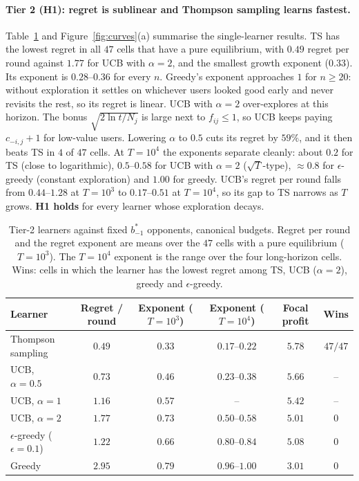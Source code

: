 \documentclass[11pt]{article}
\theoremstyle{remark}
\begin{document}
\paragraph{Tier 2 (H1): regret is sublinear and Thompson sampling learns fastest.}
Table~\ref{tab:t2} and Figure~\ref{fig:curves}(a) summarise the single-learner results. TS has the
lowest regret in all $47$ cells that have a pure equilibrium, with $0.49$ regret per round against
$1.77$ for UCB with $\alpha=2$, and the smallest growth exponent ($0.33$). Its exponent is $0.28$--$0.36$
for every $n$. Greedy's exponent approaches $1$ for $n\ge20$: without exploration it settles on whichever
users looked good early and never revisits the rest, so its regret is linear. UCB with $\alpha=2$
over-explores at this horizon. The bonus $\sqrt{2\ln t/N_j}$ is large next to $f_{ij}\le1$, so UCB keeps
paying $c_{-i,j}+1$ for low-value users. Lowering $\alpha$ to $0.5$ cuts its regret by $59\%$, and it
then beats TS in $4$ of $47$ cells.
At $T=10^4$ the exponents separate cleanly: about $0.2$ for TS (close to logarithmic), $0.5$--$0.58$ for UCB
with $\alpha=2$ ($\sqrt T$-type), $\approx0.8$ for $\epsilon$-greedy (constant exploration) and $1.00$
for greedy. UCB's regret per round falls from $0.44$--$1.28$ at $T=10^3$ to $0.17$--$0.51$ at $T=10^4$,
so its gap to TS narrows as $T$ grows. \textbf{H1 holds} for every learner whose exploration decays.

\begin{table}[t]
\centering\small
\caption{Tier-2 learners against fixed $b^*_{-1}$ opponents, canonical budgets. Regret per round and
the regret exponent are means over the $47$ cells with a pure equilibrium ($T=10^3$). The $T=10^4$
exponent is the range over the four long-horizon cells. Wins: cells in which the learner has the
lowest regret among TS, UCB ($\alpha=2$), greedy and $\epsilon$-greedy.}
\label{tab:t2}
\begin{tabular}{@{}lccccc@{}}
\toprule
Learner & Regret / round & Exponent ($T=10^3$) & Exponent ($T=10^4$) & Focal profit & Wins\\
\midrule
Thompson sampling & $\mathbf{0.49}$ & $\mathbf{0.33}$ & $\mathbf{0.17}$--$\mathbf{0.22}$ & $\mathbf{5.78}$ & $47/47$\\
UCB, $\alpha=0.5$ & $0.73$ & $0.46$ & $0.23$--$0.38$ & $5.66$ & --\\
UCB, $\alpha=1$ & $1.16$ & $0.57$ & -- & $5.42$ & --\\
UCB, $\alpha=2$ & $1.77$ & $0.73$ & $0.50$--$0.58$ & $5.01$ & $0$\\
$\epsilon$-greedy ($\epsilon=0.1$) & $1.22$ & $0.66$ & $0.80$--$0.84$ & $5.08$ & $0$\\
Greedy & $2.95$ & $0.79$ & $0.96$--$1.00$ & $3.01$ & $0$\\
\bottomrule
\end{tabular}
\end{table}
\end{document}
